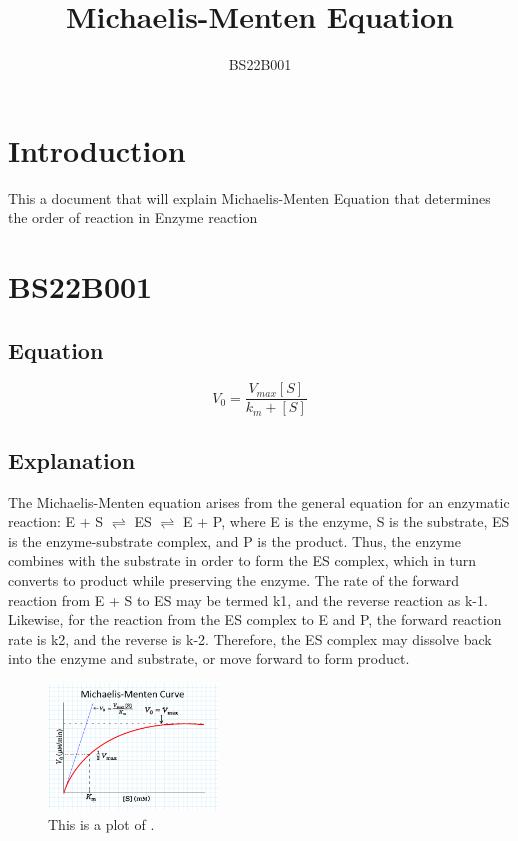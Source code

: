 \documentclass{article}
\title{Michaelis-Menten  Equation}
\author{BS22B001}
\begin{document}
\maketitle
\section{Introduction}

This a document that will explain Michaelis-Menten Equation that determines the order of reaction in Enzyme reaction

\section{BS22B001}
\subsection{Equation}

\begin{equation}
    V_0 = \frac{V_{max}[S]}{k_m+[S]}
\end{equation}
\footnotemark

\subsection{Explanation}

The Michaelis-Menten equation arises from the general equation for an enzymatic reaction:
E + S $\rightleftharpoons$  ES $\rightleftharpoons$  E + P, where E is the enzyme, S is the substrate, ES is the enzyme-substrate complex, and P is the product. Thus, the enzyme combines with the substrate in order to form the ES complex, which in turn converts to product while preserving the enzyme. The rate of the forward reaction from E + S to ES may be termed k1, and the reverse reaction as k-1. Likewise, for the reaction from the ES complex to E and P, the forward reaction rate is k2, and the reverse is k-2. Therefore, the ES complex may dissolve back into the enzyme and substrate, or move forward to form product. 


\begin{figure}
\centering
\includegraphics[width=0.4\textwidth]{2.png}
\caption{\label{fig:frog}This is a plot of .}
\end{figure}
\end{document}
